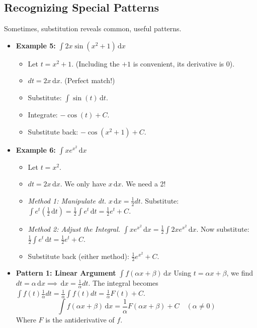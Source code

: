 \documentclass[11pt]{article}
\newcommand{\dx}{\,\mathrm{d}x} %
\newcommand{\dt}{\,\mathrm{d}t} %
\begin{document}
\subsection{Recognizing Special Patterns}

Sometimes, substitution reveals common, useful patterns.

\begin{itemize}
    \item \textbf{Example 5:} $\int 2x \sin(x^2+1) \dx$
        \begin{itemize}
            \item Let $t = x^2+1$. (Including the $+1$ is convenient, its derivative is 0).
            \item $dt = 2x \dx$. (Perfect match!)
            \item Substitute: $\int \sin(t) \dt$.
            \item Integrate: $-\cos(t) + C$.
            \item Substitute back: $\boxed{-\cos(x^2+1) + C}$.
        \end{itemize}

    \item \textbf{Example 6:} $\int x e^{x^2} \dx$
        \begin{itemize}
            \item Let $t = x^2$.
            \item $dt = 2x \dx$. We only have $x \dx$. We need a 2!
            \item \textit{Method 1: Manipulate dt.} $x \dx = \frac{1}{2} dt$. Substitute: $\int e^t \left(\frac{1}{2} \dt\right) = \frac{1}{2} \int e^t \dt = \frac{1}{2} e^t + C$.
            \item \textit{Method 2: Adjust the Integral.} $\int x e^{x^2} \dx = \frac{1}{2} \int 2x e^{x^2} \dx$. Now substitute: $\frac{1}{2} \int e^t \dt = \frac{1}{2} e^t + C$.
            \item Substitute back (either method): $\boxed{\frac{1}{2}e^{x^2} + C}$.
        \end{itemize}

    \item \textbf{Pattern 1: Linear Argument} $\int f(\alpha x + \beta) \dx$
        Using $t = \alpha x + \beta$, we find $dt = \alpha \dx \implies \dx = \frac{1}{\alpha} dt$.
        The integral becomes $\int f(t) \frac{1}{\alpha} dt = \frac{1}{\alpha} \int f(t) dt = \frac{1}{\alpha} F(t) + C$.
        \[ \boxed{\int f(\alpha x + \beta) \dx = \frac{1}{\alpha} F(\alpha x + \beta) + C} \quad (\alpha \neq 0) \]
        Where $F$ is the antiderivative of $f$.


\end{itemize}
\end{document}
